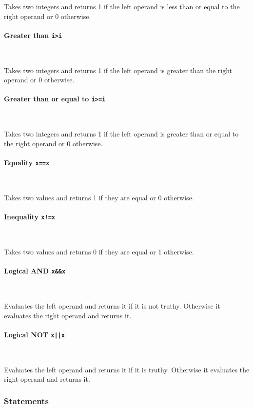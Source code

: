 \documentclass[12pt, a4paper]{article}
\begin{document}
Takes two integers and returns 1 if the left operand is less than or equal to the right operand or 0 otherwise.

\paragraph{Greater than \quad \texttt{i>i}} \

Takes two integers and returns 1 if the left operand is greater than the right operand or 0 otherwise.

\paragraph{Greater than or equal to \quad \texttt{i>=i}} \

Takes two integers and returns 1 if the left operand is greater than or equal to the right operand or 0 otherwise.

\paragraph{Equality \quad \texttt{x==x}} \

Takes two values and returns 1 if they are equal or 0 otherwise.

\paragraph{Inequality \quad \texttt{x!=x}} \

Takes two values and returns 0 if they are equal or 1 otherwise.

\paragraph{Logical AND \quad \texttt{x\&\&x}} \

Evaluates the left operand and returns it if it is not truthy. Otherwise it evaluates the right operand and returns it.

\paragraph{Logical NOT \quad \texttt{x||x}} \

Evaluates the left operand and returns it if it is truthy. Otherwise it evaluates the right operand and returns it.

\subsubsection{Statements}
\end{document}
